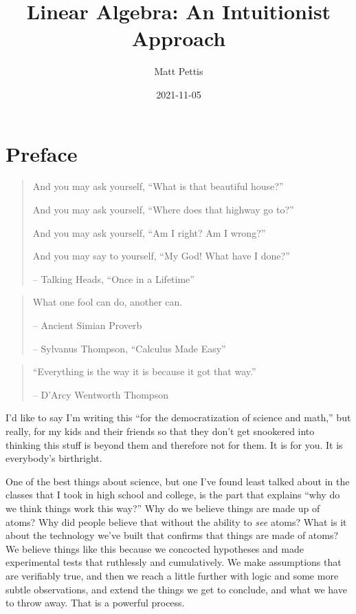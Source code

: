 \documentclass[
]{book}
\title{Linear Algebra: An Intuitionist Approach}
\author{Matt Pettis}
\date{2021-11-05}
\begin{document}
\maketitle

{
\setcounter{tocdepth}{1}
\tableofcontents
}
\hypertarget{preface}{%
\chapter{Preface}\label{preface}}

\begin{quote}
And you may ask yourself, ``What is that beautiful house?''

And you may ask yourself, ``Where does that highway go to?''

And you may ask yourself, ``Am I right? Am I wrong?''

And you may say to yourself, ``My God! What have I done?''

-- Talking Heads, ``Once in a Lifetime''
\end{quote}

\begin{quote}
What one fool can do, another can.

-- Ancient Simian Proverb

-- Sylvanus Thompson, ``Calculus Made Easy''
\end{quote}

\begin{quote}
``Everything is the way it is because it got that way.''

-- D'Arcy Wentworth Thompson
\end{quote}

I'd like to say I'm writing this ``for the democratization of science and math,'' but really, for my kids and their friends so that they don't get snookered into thinking this stuff is beyond them and therefore not for them. It is for you. It is everybody's birthright.

One of the best things about science, but one I've found least talked about in the classes that I took in high school and college, is the part that explains ``why do we think things work this way?'' Why do we believe things are made up of atoms? Why did people believe that without the ability to \emph{see} atoms? What is it about the technology we've built that confirms that things are made of atoms? We believe things like this because we concocted hypotheses and made experimental tests that ruthlessly and cumulatively. We make assumptions that are verifiably true, and then we reach a little further with logic and some more subtle observations, and extend the things we get to conclude, and what we have to throw away. That is a powerful process.
\end{document}
